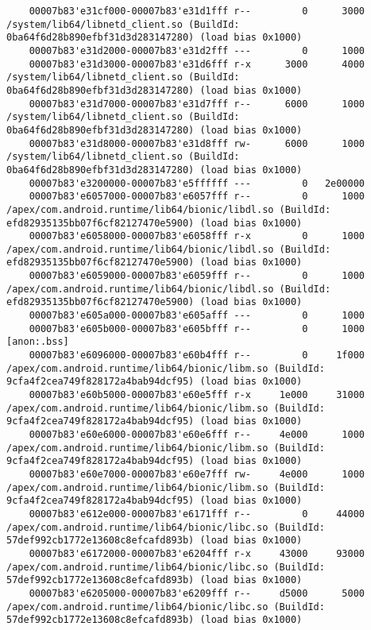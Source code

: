 \begin{lstlisting}
    00007b83'e31cf000-00007b83'e31d1fff r--         0      3000  /system/lib64/libnetd_client.so (BuildId: 0ba64f6d28b890efbf31d3d283147280) (load bias 0x1000)
    00007b83'e31d2000-00007b83'e31d2fff ---         0      1000
    00007b83'e31d3000-00007b83'e31d6fff r-x      3000      4000  /system/lib64/libnetd_client.so (BuildId: 0ba64f6d28b890efbf31d3d283147280) (load bias 0x1000)
    00007b83'e31d7000-00007b83'e31d7fff r--      6000      1000  /system/lib64/libnetd_client.so (BuildId: 0ba64f6d28b890efbf31d3d283147280) (load bias 0x1000)
    00007b83'e31d8000-00007b83'e31d8fff rw-      6000      1000  /system/lib64/libnetd_client.so (BuildId: 0ba64f6d28b890efbf31d3d283147280) (load bias 0x1000)
    00007b83'e3200000-00007b83'e5ffffff ---         0   2e00000
    00007b83'e6057000-00007b83'e6057fff r--         0      1000  /apex/com.android.runtime/lib64/bionic/libdl.so (BuildId: efd82935135bb07f6cf82127470e5900) (load bias 0x1000)
    00007b83'e6058000-00007b83'e6058fff r-x         0      1000  /apex/com.android.runtime/lib64/bionic/libdl.so (BuildId: efd82935135bb07f6cf82127470e5900) (load bias 0x1000)
    00007b83'e6059000-00007b83'e6059fff r--         0      1000  /apex/com.android.runtime/lib64/bionic/libdl.so (BuildId: efd82935135bb07f6cf82127470e5900) (load bias 0x1000)
    00007b83'e605a000-00007b83'e605afff ---         0      1000
    00007b83'e605b000-00007b83'e605bfff r--         0      1000  [anon:.bss]
    00007b83'e6096000-00007b83'e60b4fff r--         0     1f000  /apex/com.android.runtime/lib64/bionic/libm.so (BuildId: 9cfa4f2cea749f828172a4bab94dcf95) (load bias 0x1000)
    00007b83'e60b5000-00007b83'e60e5fff r-x     1e000     31000  /apex/com.android.runtime/lib64/bionic/libm.so (BuildId: 9cfa4f2cea749f828172a4bab94dcf95) (load bias 0x1000)
    00007b83'e60e6000-00007b83'e60e6fff r--     4e000      1000  /apex/com.android.runtime/lib64/bionic/libm.so (BuildId: 9cfa4f2cea749f828172a4bab94dcf95) (load bias 0x1000)
    00007b83'e60e7000-00007b83'e60e7fff rw-     4e000      1000  /apex/com.android.runtime/lib64/bionic/libm.so (BuildId: 9cfa4f2cea749f828172a4bab94dcf95) (load bias 0x1000)
    00007b83'e612e000-00007b83'e6171fff r--         0     44000  /apex/com.android.runtime/lib64/bionic/libc.so (BuildId: 57def992cb1772e13608c8efcafd893b) (load bias 0x1000)
    00007b83'e6172000-00007b83'e6204fff r-x     43000     93000  /apex/com.android.runtime/lib64/bionic/libc.so (BuildId: 57def992cb1772e13608c8efcafd893b) (load bias 0x1000)
    00007b83'e6205000-00007b83'e6209fff r--     d5000      5000  /apex/com.android.runtime/lib64/bionic/libc.so (BuildId: 57def992cb1772e13608c8efcafd893b) (load bias 0x1000)

\end{lstlisting}
